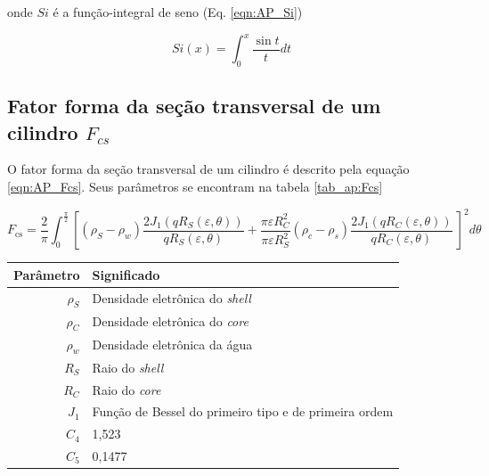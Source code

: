 \begin{apendicesenv}
\noindent onde \(Si\) é a função-integral de seno (Eq. \ref{eqn:AP_Si})

\begin{equation}
Si(x) = \int_0^x \frac{\sin t}{t}dt
\label{eqn:AP_Si}
\end{equation}

\subsection{Fator forma da seção transversal de um cilindro \(F_{cs}\)}

O fator forma da seção transversal de um cilindro é descrito pela equação \ref{eqn:AP_Fcs}. Seus parâmetros se encontram na tabela \ref{tab_ap:Fcs}

\begin{equation}
F_{\text{cs}} = \frac{2}{\pi}\int_{0}^{\frac{\pi}{2}}%
%
\left[ \left(\rho_{S} - \rho_{w} \right) \frac{2J_1 \left( qR_{S}\left( \varepsilon,\theta \right) \right)}{qR_{S}\left( \varepsilon,\theta \right)} %
%
+  %
%
\frac{\pi\varepsilon R_C^2}{\pi\varepsilon R_S^2}\left( \rho_c - \rho_s \right)	%
%
\frac{2J_1\left( qR_{C}\left( \varepsilon,\theta \right) \right)}{qR_{C}\left( \varepsilon,\theta \right)}\  \right]^2 d\theta
\label{eqn:AP_Fcs}
\end{equation}


\begin{table}
    {\begin{tabular}{r l}
            \toprule
            Parâmetro 			& Significado \\
            \midrule
            \(\rho_S\)			&  Densidade eletrônica do \emph{shell} \\
            \(\rho_C\)			&  Densidade eletrônica do \emph{core}  \\
            \(\rho_w\)			&  Densidade eletrônica da água			\\
            \(R_S\)			& Raio do \emph{shell} 						\\
            \(R_C\)			& Raio do \emph{core}						\\
            \(J_1\)			&  Função de Bessel do primeiro tipo e de primeira ordem\\
            \(C_4\)			&  1,523	\\
            \(C_5\)			&  0,1477 	\\						
            \bottomrule
        \end{tabular}}%
    {}%
\end{table}


\end{apendicesenv}
